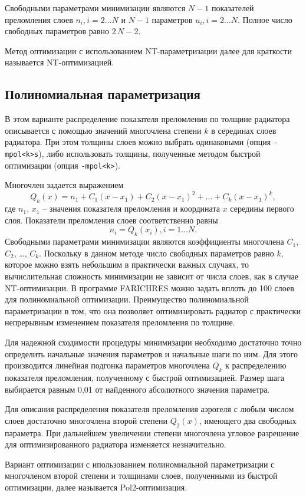 \documentclass[12pt]{article}
\begin{document}
Свободными параметрами минимизации являются $N-1$ показателей преломления слоев $n_i, i=2\ldots N$ и $N-1$ параметров $u_i, i=2\ldots N$. 
Полное число свободных параметров равно $2\,N - 2$.

Метод оптимизации с использованием NT-параметризации далее для краткости называется NT-оптимизацией.

\subsection{Полиномиальная параметризация}
\label{ss:polpar}
В этом варианте распределение показателя преломления по толщине радиатора описывается с помощью значений многочлена степени $k$ в серединах 
слоев радиатора. При этом толщины слоев можно выбрать одинаковыми (опция {\tt -mpol<k>s}), либо использовать толщины, полученные методом быстрой 
оптимизации (опция {\tt -mpol<k>}).

Многочлен задается выражением
\[ Q_k(x) = n_1 + C_1(x-x_1) + C_2(x-x_1)^2 + \ldots + C_k(x-x_1)^k, \]
где $n_1,\,x_1$ -- значения показателя преломления и координата $x$ середины первого слоя. Показатели преломления слоев соответственно равны
\[ n_i = Q_k(x_i), i=1\ldots N. \]
Свободными параметрами минимизации являются коэффициенты многочлена $C_1$, $C_2$, \ldots, $C_k$. Поскольку в данном методе число 
свободных параметров равно $k$, которое можно взять небольшим в практически важных случаях, то вычислительная сложность минимизации 
не зависит от числа слоев, как в случае NT-оптимизации. В программе FARICHRES можно задать вплоть до 100 слоев для полиномиальной оптимизации. 
Преимущество полиномиальной параметризации в том, что она позволяет оптимизировать радиатор с практически непрерывным изменением показателя преломления по толщине.

Для надежной сходимости процедуры минимизации необходимо достаточно точно определить начальные значения
параметров и начальные шаги по ним. Для этого производится линейная подгонка параметров многочлена $Q_k$ к распределению показателя преломления,
полученному с быстрой оптимизацией. Размер шага выбирается равным 0,01 от найденного абсолютного значения параметра.

Для описания распределения показателя преломления аэрогеля с любым числом слоев достаточно многочлена второй степени $Q_2(x)$, имеющего два свободных параметра. 
При дальнейшем увеличении степени многочлена угловое разрешение для оптимизированного радиатора изменяется незначительно.

Вариант оптимизации с ипользованием полиномиальной параметризации с многочленом второй степени и толщинами слоев, полученными из быстрой 
оптимизации, далее называется Pol2-оптимизация.
\end{document}
